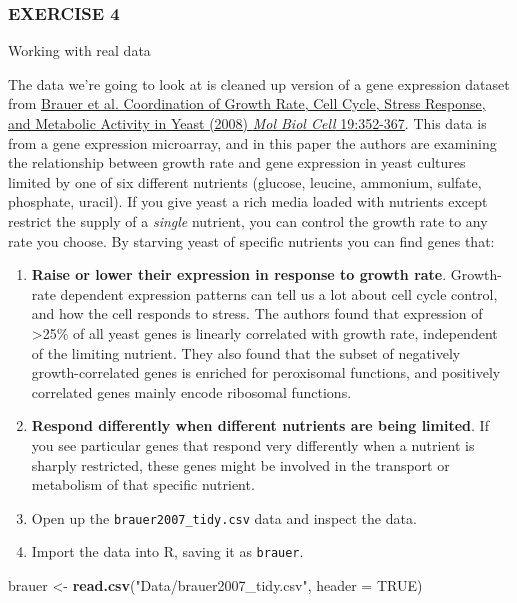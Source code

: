 \documentclass[]{article}
\newenvironment{Shaded}{\begin{snugshade}}{\end{snugshade}}
\newcommand{\KeywordTok}[1]{\textcolor[rgb]{0.13,0.29,0.53}{\textbf{#1}}}
\newcommand{\DataTypeTok}[1]{\textcolor[rgb]{0.13,0.29,0.53}{#1}}
\newcommand{\StringTok}[1]{\textcolor[rgb]{0.31,0.60,0.02}{#1}}
\newcommand{\OtherTok}[1]{\textcolor[rgb]{0.56,0.35,0.01}{#1}}
\newcommand{\NormalTok}[1]{#1}
\begin{document}
\subsubsection{EXERCISE 4}\label{exercise-4}

Working with real data

The data we're going to look at is cleaned up version of a gene
expression dataset from
\href{http://www.ncbi.nlm.nih.gov/pubmed/17959824}{Brauer et al.
Coordination of Growth Rate, Cell Cycle, Stress Response, and Metabolic
Activity in Yeast (2008) \emph{Mol Biol Cell} 19:352-367}. This data is
from a gene expression microarray, and in this paper the authors are
examining the relationship between growth rate and gene expression in
yeast cultures limited by one of six different nutrients (glucose,
leucine, ammonium, sulfate, phosphate, uracil). If you give yeast a rich
media loaded with nutrients except restrict the supply of a
\emph{single} nutrient, you can control the growth rate to any rate you
choose. By starving yeast of specific nutrients you can find genes that:

\begin{enumerate}
\def\labelenumi{\arabic{enumi}.}
\item
  \textbf{Raise or lower their expression in response to growth rate}.
  Growth-rate dependent expression patterns can tell us a lot about cell
  cycle control, and how the cell responds to stress. The authors found
  that expression of \textgreater{}25\% of all yeast genes is linearly
  correlated with growth rate, independent of the limiting nutrient.
  They also found that the subset of negatively growth-correlated genes
  is enriched for peroxisomal functions, and positively correlated genes
  mainly encode ribosomal functions.
\item
  \textbf{Respond differently when different nutrients are being
  limited}. If you see particular genes that respond very differently
  when a nutrient is sharply restricted, these genes might be involved
  in the transport or metabolism of that specific nutrient.
\item
  Open up the \texttt{brauer2007\_tidy.csv} data and inspect the data.
\item
  Import the data into R, saving it as \texttt{brauer}.
\end{enumerate}

\begin{Shaded}
\begin{Highlighting}[]
\NormalTok{ brauer <-}\StringTok{ }\KeywordTok{read.csv}\NormalTok{(}\StringTok{"Data/brauer2007_tidy.csv"}\NormalTok{, }\DataTypeTok{header =} \OtherTok{TRUE}\NormalTok{)}
\end{Highlighting}
\end{Shaded}
\end{document}

